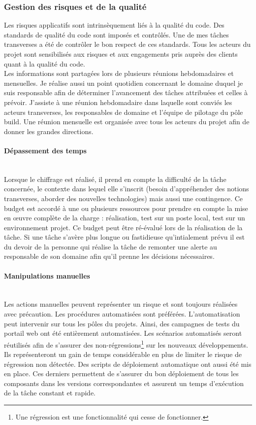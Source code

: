 \documentclass[12pt,a4paper]{article}
\begin{document}
\subsubsection{Gestion des risques et de la qualité}
Les risques applicatifs sont intrinsèquement liés à la qualité du code. Des standards de qualité du code sont imposés et contrôlés. Une de mes tâches transverses a été de contrôler le bon respect de ces standards. Tous les acteurs du projet sont sensibilisés aux risques et aux engagements pris auprès des clients quant à la qualité du code.\\
Les informations sont partagées lors de plusieurs réunions hebdomadaires et mensuelles. Je réalise aussi un point quotidien concernant le domaine duquel je suis responsable afin de déterminer l'avancement des tâches attribuées et celles à prévoir. J'assiste à une réunion hebdomadaire dans laquelle sont conviés les acteurs transverses, les responsables de domaine et l'équipe de pilotage du pôle build. Une réunion mensuelle est organisée avec tous les acteurs du projet afin de donner les grandes directions.
\paragraph{Dépassement des temps}
~~\\
Lorsque le chiffrage est réalisé, il prend en compte la difficulté de la tâche concernée, le contexte dans lequel elle s'inscrit (besoin d'appréhender des notions transverses,  aborder des nouvelles technologies) mais aussi une contingence. Ce budget est accordé à une ou plusieurs ressources pour prendre en compte la mise en œuvre complète de la charge : réalisation, test sur un poste local, test sur un environnement projet. Ce budget peut être ré-évalué lors de la réalisation de la tâche. Si une tâche s'avère plus longue ou fastidieuse qu'intialement prévu il est du devoir de la personne qui réalise la tâche de remonter une alerte au responsable de son domaine afin qu'il prenne les décisions nécessaires.
\paragraph{Manipulations manuelles}
~~\\
Les actions manuelles peuvent représenter un risque et sont toujours réalisées avec précaution. Les procédures automatisées sont préférées. L'automatisation peut intervenir sur tous les pôles du projets. Ainsi, des campagnes de tests du portail web ont été entièrement automatisées. Les scénarios automatisés seront réutilisés afin de s'assurer des non-régressions\footnote{Une régression est une fonctionnalité qui cesse de fonctionner.} sur les nouveaux développements. Ils représenteront un gain de temps considérable en plus de limiter le risque de régression non détectée. Des scripts de déploiement automatique ont aussi été mis en place. Ces derniers permettent de s'assurer du bon déploiement de tous les composants dans les versions correspondantes et assurent un temps d'exécution de la tâche constant et rapide.  
\end{document}
